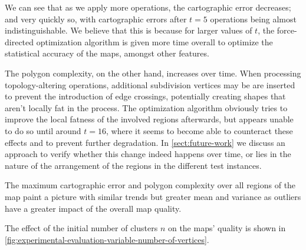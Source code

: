 We can see that as we apply more operations, the cartographic error decreases; and very quickly so, with cartographic errors after $t = 5$ operations being almost indistinguishable.
We believe that this is because for larger values of $t$, the force-directed optimization algorithm is given more time overall to optimize the statistical accuracy of the maps, amongst other features.

The polygon complexity, on the other hand, increases over time.
When processing topology-altering operations, additional subdivision vertices may be are inserted to prevent the introduction of edge crossings, potentially creating shapes that aren't locally fat in the process.
The optimization algorithm obviously tries to improve the local fatness of the involved regions afterwards, but appears unable to do so until around $t = 16$, where it seems to become able to counteract these effects and to prevent further degradation.
In \cref{sect:future-work} we discuss an approach to verify whether this change indeed happens over time, or lies in the nature of the arrangement of the regions in the different test instances.

The maximum cartographic error and polygon complexity over all regions of the map paint a picture with similar trends but greater mean and variance as outliers have a greater impact of the overall map quality.

\vspace{1cm}

The effect of the initial number of clusters $n$ on the maps' quality is shown in \cref{fig:experimental-evaluation-variable-number-of-vertices}.

